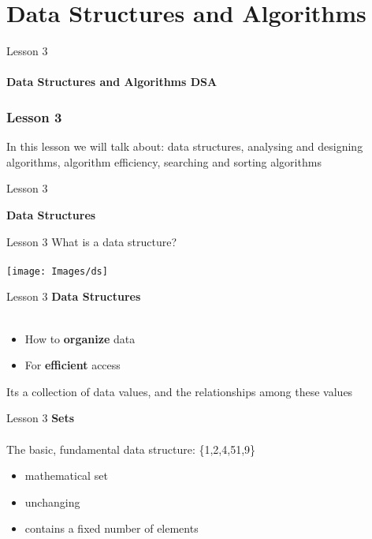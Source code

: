 \documentclass[aspectratio=1610]{beamer}
\begin{document}
\section{Data Structures and Algorithms}

\begin{frame}
\begin{center}
\Huge Lesson 3\\~\\
\textbf{Data Structures and Algorithms DSA}
\end{center}
\end{frame}



\begin{frame}
\frametitle{Lesson 3}

\Huge In this lesson we will talk about:
 \alert{data structures, analysing and designing algorithms, algorithm efficiency, searching and sorting algorithms}
\end{frame}



\begin{frame}{Lesson 3}{}
\begin{center}
\Huge \textbf{Data Structures}
\end{center}
\end{frame}


\begin{frame}{Lesson 3}{}
\Huge{What is a data structure?}\\~\\
\texttt{[image: Images/ds]}
\end{frame}



\begin{frame}{Lesson 3}{}
\LARGE
\textbf{Data Structures}\\~\\
\begin{itemize}
    \item How to \textbf{organize} data
    \item For \textbf{efficient} access
\end{itemize}

Its a collection of data values, and the relationships among these values
\end{frame}


\begin{frame}{Lesson 3}{}
\LARGE
\textbf{Sets}\\~\\
The basic, fundamental data structure: \{1,2,4,51,9\}
\begin{itemize}
    \item mathematical set
    \item unchanging
    \item contains a fixed number of elements
\end{itemize}

\end{frame}
\end{document}
